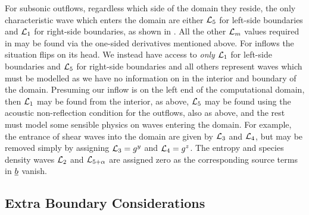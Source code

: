 For subsonic outflows, regardless which side of the domain they reside, the only characteristic wave which enters the domain are either $\mathcal{L}_5$ for left-side boundaries and $\mathcal{L}_1$ for right-side boundaries, as shown in . All the other $\mathcal{L}_m$ values required in  may be found via the one-sided derivatives mentioned above. For inflows the situation flips on its head. We instead have access to \emph{only} $\mathcal{L}_1$ for left-side boundaries and $\mathcal{L}_5$ for right-side boundaries and all others represent waves which must be modelled as we have no information on in the interior and boundary of the domain. Presuming our inflow is on the left end of the computational domain, then $\mathcal{L}_1$ may be found from the interior, as above, $\mathcal{L}_5$ may be found using the acoustic non-reflection condition for the outflows, also as above, and the rest must model some sensible physics on waves entering the domain. For example, the entrance of shear waves into the domain are given by $\mathcal{L}_{3}$ and $\mathcal{L}_{4}$, but may be removed simply by assigning $\mathcal{L}_{3} = g^y$ and $\mathcal{L}_{4} = g^z$. The entropy and species density waves $\mathcal{L}_{2}$ and $\mathcal{L}_{5 + \alpha}$ are assigned zero as the corresponding source terms in $\underline{b}$ vanish.




\subsection{Extra Boundary Considerations}






